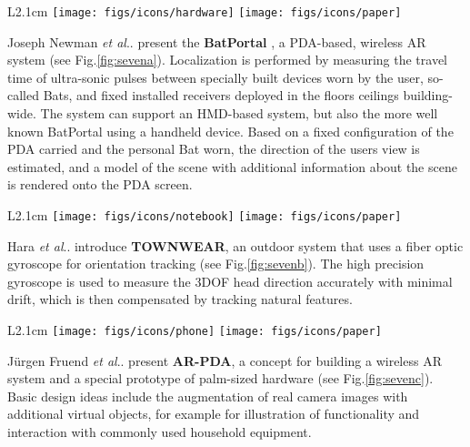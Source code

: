 \documentclass[12pt,a4paper]{article}
\makeatletter
\DeclareRobustCommand\onedot{\futurelet\@let@token\@onedot}
\def\@onedot{\ifx\@let@token.\else.\null\fi\xspace}
\def\etal{\emph{et al}\onedot}
\makeatother
\begin{document}
\begin{wrapfigure}{L}{2.1cm}
	\vspace{-10pt}	
	\texttt{[image: figs/icons/hardware]}
	\texttt{[image: figs/icons/paper]}	
	\vspace{-20pt}		
\end{wrapfigure}
Joseph Newman \etal present the \textbf{BatPortal} \cite{Newman01}, a PDA-based, wireless AR system (see Fig.\ref{fig:sevena}). Localization is performed by measuring the travel time of ultra-sonic pulses between specially built devices worn by the user, so-called Bats, and fixed installed receivers deployed in the floors ceilings building-wide. The system can support an HMD-based system, but also the more well known BatPortal using a handheld device. Based on a fixed configuration of the PDA carried and the personal Bat worn, the direction of the users view is estimated, and a model of the scene with additional information about the scene is rendered onto the PDA screen.

\vspace{0.1in}

\begin{wrapfigure}{L}{2.1cm}
	\vspace{-10pt}	
	\texttt{[image: figs/icons/notebook]}
	\texttt{[image: figs/icons/paper]}	
	\vspace{-20pt}		
\end{wrapfigure}
\noindent Hara \etal introduce \textbf{TOWNWEAR}, an outdoor system that uses a fiber optic gyroscope for orientation tracking \cite{Satoh01} (see Fig.\ref{fig:sevenb}). The high precision gyroscope is used to measure the 3DOF head direction accurately with minimal drift, which is then compensated by tracking natural features.

\vspace{0.1in}

\begin{wrapfigure}{L}{2.1cm}
	\vspace{-15pt}	
	\texttt{[image: figs/icons/phone]}
	\texttt{[image: figs/icons/paper]}	
	\vspace{-25pt}		
\end{wrapfigure}
\noindent J\"urgen Fruend \etal present \textbf{AR-PDA}, a concept for building a wireless AR system and a special prototype of palm-sized hardware \cite{Fruend01} (see Fig.\ref{fig:sevenc}). Basic design ideas include the augmentation of real camera images with additional virtual objects, for example for illustration of functionality and interaction with commonly used household equipment.
\end{document}
